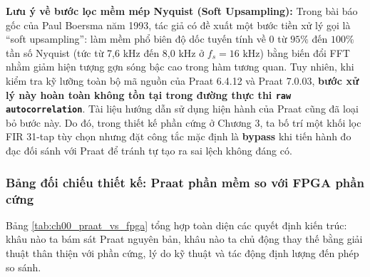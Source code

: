 \textbf{Lưu ý về bước lọc mềm mép Nyquist (Soft Upsampling):}
Trong bài báo gốc của Paul Boersma năm 1993, tác giả có đề xuất một bước tiền xử lý gọi là ``soft upsampling'': làm mềm phổ biên độ dốc tuyến tính về 0 từ $95\%$ đến $100\%$ tần số Nyquist (tức từ 7,6 kHz đến 8,0 kHz ở $f_s = 16\text{ kHz}$) bằng biến đổi FFT nhằm giảm hiện tượng gợn sóng bậc cao trong hàm tương quan. Tuy nhiên, khi kiểm tra kỹ lưỡng toàn bộ mã nguồn của Praat 6.4.12 và Praat 7.0.03, \textbf{bước xử lý này hoàn toàn không tồn tại trong đường thực thi \texttt{raw autocorrelation}}. Tài liệu hướng dẫn sử dụng hiện hành của Praat cũng đã loại bỏ bước này. Do đó, trong thiết kế phần cứng ở Chương 3, ta bố trí một khối lọc FIR 31-tap tùy chọn nhưng đặt công tắc mặc định là \textbf{bypass} khi tiến hành đo đạc đối sánh với Praat để tránh tự tạo ra sai lệch không đáng có.

\subsubsection*{Bảng đối chiếu thiết kế: Praat phần mềm so với FPGA phần cứng}
Bảng \ref{tab:ch00_praat_vs_fpga} tổng hợp toàn diện các quyết định kiến trúc: khâu nào ta bám sát Praat nguyên bản, khâu nào ta chủ động thay thế bằng giải thuật thân thiện với phần cứng, lý do kỹ thuật và tác động định lượng đến phép so sánh.

